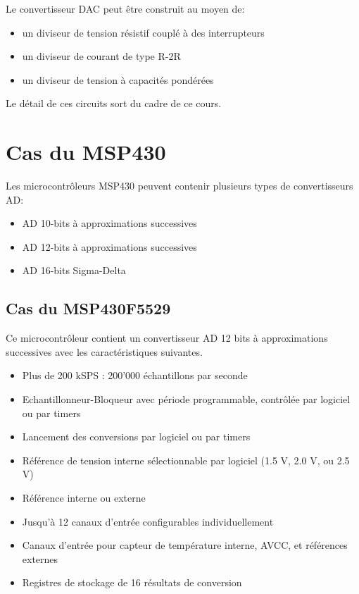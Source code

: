 Le convertisseur DAC peut être construit au moyen de:
\begin{itemize}[label=\textbullet,font=\small]
  \item un diviseur de tension résistif couplé à des interrupteurs
  \item un diviseur de courant de type R-2R
  \item un diviseur de tension à capacités pondérées
\end{itemize}
Le détail de ces circuits sort du cadre de ce cours.

\section{Cas du MSP430}
Les microcontrôleurs MSP430 peuvent contenir plusieurs types de convertisseurs AD:
\begin{itemize}[label=\textbullet,font=\small]
  \item AD 10-bits à approximations successives
  \item AD 12-bits à approximations successives
  \item AD 16-bits Sigma-Delta
\end{itemize}

\subsection{Cas du MSP430F5529}
Ce microcontrôleur contient un convertisseur AD 12 bits à approximations successives avec les caractéristiques suivantes.
\begin{itemize}[label=\textbullet,font=\small]
  \item Plus de 200 kSPS : 200'000 échantillons par seconde
  \item Echantillonneur-Bloqueur avec période programmable, contrôlée par logiciel ou par timers
  \item Lancement des conversions par logiciel ou par timers
  \item Référence de tension interne sélectionnable par logiciel (1.5 V, 2.0 V, ou 2.5 V)
  \item Référence interne ou externe
  \item Jusqu'à 12 canaux d'entrée configurables individuellement
  \item Canaux d'entrée pour capteur de température interne, AVCC, et références externes
  \item Registres de stockage de 16 résultats de conversion
\end{itemize}

